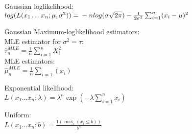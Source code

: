 Gaussian loglikelihood:\\

$log(L(x_1\dots x_n;\mu,\sigma^2))= \\-n log(\sigma\sqrt{2\pi})-\frac{1}{2\sigma^2}\sum_{i=1}^n (x_i-\mu)^2 $

Gaussian Maximum-loglikelihood estimators:\\

 MLE estimator for $\sigma^2 = \tau$:\\  
$\hat{\tau }_ n^{MLE} = \frac{1}{n} \sum _{i = 1}^ n X_ i^2$\\

MLE estimators:\\

$\hat{\mu}_ n^{MLE}=\frac{1}{n}\sum_{i=1}(x_i)$

Exponential likelihood:\\
$L(x_1\dots x_n;\lambda)=\lambda^n\exp\left(-\lambda\sum_{i=1}^n x_i\right)$


Uniform:\\
$L(x_1\dots x_n;b)=\frac{1(\max_i (x_i \leq b))} {b^n}$\\


